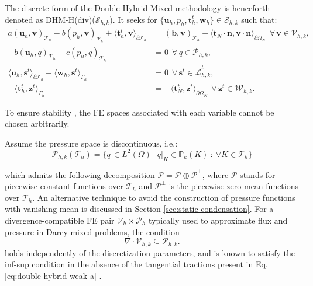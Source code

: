 \documentclass[english,11pt,3p,number,sort&compress]{elsarticle}
\begin{document}
The discrete form of the Double Hybrid Mixed methodology is henceforth denoted as DHM-H(div)($\mathcal{S}_{h,k}$). It seeks for $\{\bm{u}_h,p_h,\bm{t}^t_h,\bm{w}_h\} \in \mathcal{S}_{h,k}$ such that:
\begin{subequations} \label{eq:double-hybrid-discrete}
	\begin{align}
		a\left(\bm{u}_h,\bm{v}\right)_{\mathcal{T}_h} - b\left( p_h, \bm{v}\right)_{\mathcal{T}_h} +\langle\bm{t}^t_h,\bm{v}\rangle_{\partial\mathcal{T}_h} &= \left(\bm{b},\bm{v}\right)_{\mathcal{T}_h} + \langle\bm{t}_N\cdot\bm{n},\bm{v}\cdot\bm{n}\rangle_{\partial\Omega_N} ~~\forall\, \bm{v} \in \mathcal{V}_{h,k},\label{eq:double-hybrid-discrete-a}\\ 
		-b\left(\bm{u}_h, q\right)_{\mathcal{T}_h} - c\left(p_h,q \right)_{\mathcal{T}_h} &= 0 ~~\forall\, q \in \mathcal{P}_{h,k}, \label{eq:double-hybrid-discrete-b}\\
		\langle\bm{u}_h,\bm{s}^t\rangle_{\partial\mathcal{T}_h} - \langle\bm{w}_h,\bm{s}^t\rangle_{\Gamma_h} &= 0 ~~\forall\, \bm{s}^t \in \bar{\mathcal{L}}^t_{h,k}, \label{eq:double-hybrid-discrete-c}\\
		-\langle\bm{t}^t_h,\bm{z}^t\rangle_{\Gamma_h} &= -\langle\bm{t}_N^t,\bm{z}^t\rangle_{\partial\Omega_N} ~~\forall\, \bm{z}^t \in \mathcal{W}_{h,k}. \label{eq:double-hybrid-discrete-d}
	\end{align}
\end{subequations}

To ensure stability \cite{girault2012finite,brezzi2012mixed,arnold1988new}, the FE spaces associated with each variable cannot be chosen arbitrarily. 

Assume the pressure space is discontinuous, i.e.:
\begin{equation}
	\mathcal{P}_{h,k}(\mathcal{T}_h) = \{q \, \in L^2(\Omega) ~\lvert~ q\lvert_K \in \mathbb{P}_k(K) ~:~ \forall K \in \mathcal{T}_h\}
\end{equation}

\noindent which admits the following decomposition $\mathcal{P}=\bar{\mathcal{P}} \oplus \mathcal{P}^\perp$, where $\bar{\mathcal{P}}$ stands for piecewise constant functions over $\mathcal{T}_h$ and $\mathcal{P}^\perp$ is the piecewise zero-mean functions over $\mathcal{T}_h$. An alternative technique to avoid the construction of pressure functions with vanishing mean is discussed in Section \ref{sec:static-condensation}. For a divergence-compatible FE pair $\mathcal{V}_h \times \mathcal{P}_h$ typically used to approximate flux and pressure in Darcy mixed problems, the condition
\begin{equation*}
	\nabla \cdot \mathcal{V}_{h,k} \subseteq \mathcal{P}_{h,k}.
\end{equation*}
holds independently of the discretization parameters, and is known to satisfy the inf-sup condition in the absence of the tangential tractions present in Eq. \eqref{eq:double-hybrid-weak-a} \cite{carvalho2024semi}.
\end{document}
